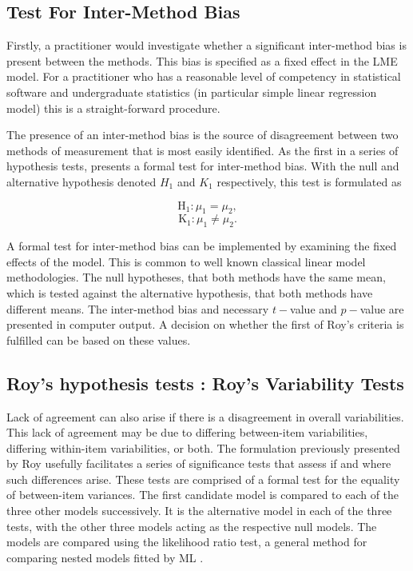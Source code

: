 \documentclass[12pt, a4paper]{report}
\theoremstyle{plain}
\theoremstyle{definition}
\theoremstyle{remark}
\begin{document}
	

		

	\subsection{Test For Inter-Method Bias}
	
	Firstly, a practitioner would investigate whether a significant inter-method bias is present between the methods. This bias is specified as a fixed effect in the LME model.  For a practitioner who has a reasonable level of competency in statistical software and undergraduate statistics (in particular simple linear regression model) this is a straight-forward procedure.
	
	The presence of an inter-method bias is the source of disagreement between two methods of measurement that is most easily identified. As the first in a series of hypothesis tests, \citet{ARoy2009} presents a formal test for inter-method bias. With the null and alternative hypothesis denoted $H_1$ and $K_1$ respectively, this test is formulated as
	
	\[	\operatorname{H_1} : \mu_1 = \mu_2 ,\]
	\[	\operatorname{K_1} : \mu_1 \neq \mu_2.\]
	
	
	
	
	A formal test for inter-method bias can be implemented by examining the fixed effects of the model. This is common to well known classical linear model methodologies. The null hypotheses, that both methods have the same mean, which is tested against the alternative hypothesis, that both methods have different means.
	The inter-method bias and necessary $t-$value and $p-$value are presented in computer output. A decision on whether the first of Roy's criteria is fulfilled can be based on these values.
	
	

	\subsection{Roy's hypothesis tests : Roy's Variability Tests}
	
	Lack of agreement can also arise if there is a disagreement in overall variabilities. This lack of agreement may be due to differing between-item variabilities, differing within-item variabilities, or both. The formulation previously presented by Roy usefully facilitates a series of significance tests that assess if and where such differences arise. These tests are comprised of a formal test for the equality of between-item variances.
		The first candidate model is compared to each of the three other models successively. It is the alternative model in each of the three tests, with the other three models acting as the respective null models. The models are compared using the likelihood ratio test, a general method for comparing nested models fitted by ML \citep{Lehmann2006}.
		
\end{document}
